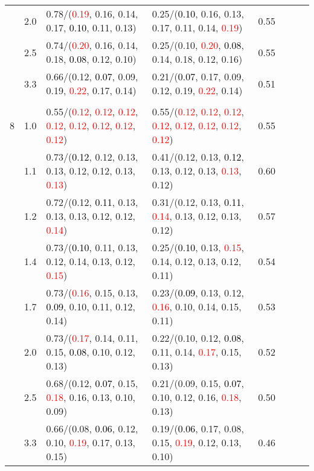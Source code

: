 \documentclass[10pt,a4paper]{report}
\begin{document}
\begin{table}[!htbp]
\begin{center}
{\begin{tabular}{ccllcccc}
			&2.0&0.78/(\textcolor{red}{0.19}, 0.16, 0.14, 0.17, \textcolor{black}{0.10}, 0.11, 0.13)&0.25/(\textcolor{black}{0.10}, 0.16, 0.13, 0.17, 0.11, 0.14, \textcolor{red}{0.19})&0.55\\
			&2.5&0.74/(\textcolor{red}{0.20}, 0.16, 0.14, 0.18, \textcolor{black}{0.08}, 0.12, 0.10)&0.25/(0.10, \textcolor{red}{0.20}, \textcolor{black}{0.08}, 0.14, 0.18, 0.12, 0.16)&0.55\\
			&3.3&0.66/(0.12, \textcolor{black}{0.07}, 0.09, 0.19, \textcolor{red}{0.22}, 0.17, 0.14)&0.21/(\textcolor{black}{0.07}, 0.17, 0.09, 0.12, 0.19, \textcolor{red}{0.22}, 0.14)&0.51\\
			&&&&\\
			8			&1.0&0.55/(\textcolor{red}{0.12}, \textcolor{red}{0.12}, \textcolor{red}{0.12}, \textcolor{red}{0.12}, \textcolor{red}{0.12}, \textcolor{red}{0.12}, \textcolor{red}{0.12}, \textcolor{red}{0.12})&0.55/(\textcolor{red}{0.12}, \textcolor{red}{0.12}, \textcolor{red}{0.12}, \textcolor{red}{0.12}, \textcolor{red}{0.12}, \textcolor{red}{0.12}, \textcolor{red}{0.12}, \textcolor{red}{0.12})&0.55\\
			&1.1&0.73/(\textcolor{black}{0.12}, 0.12, 0.13, 0.13, 0.12, 0.12, 0.13, \textcolor{red}{0.13})&0.41/(0.12, 0.13, \textcolor{black}{0.12}, 0.13, 0.12, 0.13, \textcolor{red}{0.13}, 0.12)&0.60\\
			&1.2&0.72/(0.12, \textcolor{black}{0.11}, 0.13, 0.13, 0.13, 0.12, 0.12, \textcolor{red}{0.14})&0.31/(0.12, 0.13, \textcolor{black}{0.11}, \textcolor{red}{0.14}, 0.13, 0.12, 0.13, 0.12)&0.57\\
			&1.4&0.73/(\textcolor{black}{0.10}, 0.11, 0.13, 0.12, 0.14, 0.13, 0.12, \textcolor{red}{0.15})&0.25/(\textcolor{black}{0.10}, 0.13, \textcolor{red}{0.15}, 0.14, 0.12, 0.13, 0.12, 0.11)&0.54\\
			&1.7&0.73/(\textcolor{red}{0.16}, 0.15, 0.13, \textcolor{black}{0.09}, 0.10, 0.11, 0.12, 0.14)&0.23/(\textcolor{black}{0.09}, 0.13, 0.12, \textcolor{red}{0.16}, 0.10, 0.14, 0.15, 0.11)&0.53\\
			&2.0&0.73/(\textcolor{red}{0.17}, 0.14, 0.11, 0.15, \textcolor{black}{0.08}, 0.10, 0.12, 0.13)&0.22/(0.10, 0.12, \textcolor{black}{0.08}, 0.11, 0.14, \textcolor{red}{0.17}, 0.15, 0.13)&0.52\\
			&2.5&0.68/(0.12, \textcolor{black}{0.07}, 0.15, \textcolor{red}{0.18}, 0.16, 0.13, 0.10, 0.09)&0.21/(0.09, 0.15, \textcolor{black}{0.07}, 0.10, 0.12, 0.16, \textcolor{red}{0.18}, 0.13)&0.50\\
			&3.3&0.66/(0.08, \textcolor{black}{0.06}, 0.12, 0.10, \textcolor{red}{0.19}, 0.17, 0.13, 0.15)&0.19/(\textcolor{black}{0.06}, 0.17, 0.08, 0.15, \textcolor{red}{0.19}, 0.12, 0.13, 0.10)&0.46\\
			\bottomrule
		\end{tabular}}
	\end{center}
\end{table}
\end{document}
